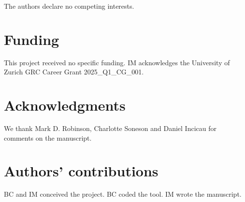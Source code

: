 \documentclass[10pt]{article}
\begin{document}
The authors declare no competing interests.

\section*{Funding}

This project received no specific funding. IM acknowledges the University of Zurich GRC Career Grant 2025\_Q1\_CG\_001.

\section*{Acknowledgments}

We thank Mark D. Robinson, Charlotte Soneson and Daniel Incicau for comments on the manuscript.

\section*{Authors' contributions}

BC and IM conceived the project. BC coded the tool. IM wrote the manuscript.



\end{document}

